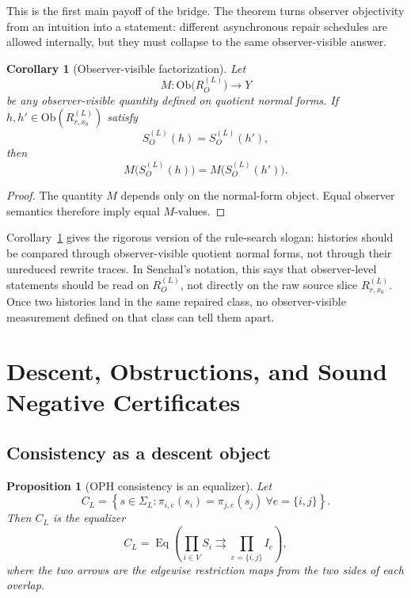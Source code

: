 \documentclass[11pt]{article}
\newtheorem{proposition}[theorem]{Proposition}
\newtheorem{corollary}[theorem]{Corollary}
\theoremstyle{remark}
\theoremstyle{plain}
\begin{document}
This is the first main payoff of the bridge. The theorem turns observer objectivity from an intuition into a statement: different asynchronous repair schedules are allowed internally, but they must collapse to the same observer-visible answer.

\begin{corollary}[Observer-visible factorization]
\label{cor:factorization}
Let
\[
M:\mathrm{Ob}\bigl(R_O^{(L)}\bigr)\to Y
\]
be any observer-visible quantity defined on quotient normal forms. If \(h,h'\in\mathrm{Ob}(R^{(L)}_{r,x_0})\) satisfy
\[
S_O^{(L)}(h)=S_O^{(L)}(h'),
\]
then
\[
M\bigl(S_O^{(L)}(h)\bigr)=M\bigl(S_O^{(L)}(h')\bigr).
\]
\end{corollary}

\begin{proof}
The quantity \(M\) depends only on the normal-form object. Equal observer semantics therefore imply equal \(M\)-values.
\end{proof}

Corollary~\ref{cor:factorization} gives the rigorous version of the rule-search slogan: histories should be compared through observer-visible quotient normal forms, not through their unreduced rewrite traces. In Senchal's notation, this says that observer-level statements should be read on \(R_O^{(L)}\), not directly on the raw source slice \(R^{(L)}_{r,x_0}\). Once two histories land in the same repaired class, no observer-visible measurement defined on that class can tell them apart.

\section{Descent, Obstructions, and Sound Negative Certificates}
\label{sec:descent}

\subsection{Consistency as a descent object}

\begin{proposition}[OPH consistency is an equalizer]
\label{prop:equalizer}
Let
\[
C_L=
\left\{
s\in\Sigma_L:
\pi_{i,e}(s_i)=\pi_{j,e}(s_j)\ \forall e=\{i,j\}
\right\}.
\]
Then \(C_L\) is the equalizer
\[
C_L=
\operatorname{Eq}\!\left(
\prod_{i\in V}S_i
\rightrightarrows
\prod_{e=\{i,j\}} I_e
\right),
\]
where the two arrows are the edgewise restriction maps from the two sides of each overlap.
\end{proposition}
\end{document}
